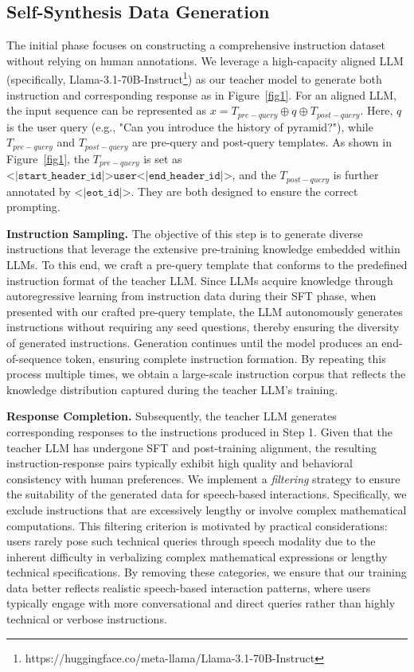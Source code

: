 \documentclass[letterpaper]{article} %
\begin{document}
\subsection{Self-Synthesis Data Generation}
The initial phase focuses on constructing a comprehensive instruction dataset without relying on human annotations. We leverage a high-capacity aligned LLM (specifically, Llama-3.1-70B-Instruct\footnote{https://huggingface.co/meta-llama/Llama-3.1-70B-Instruct}) as our teacher model to generate both instruction and corresponding response as in Figure~\ref{fig1}. For an aligned LLM, the input sequence can be represented as $x = T_{pre-query} \oplus q \oplus T_{post-query}$. Here, $q$ is the user query (e.g., "Can you introduce the history of pyramid?"), while $T_{pre-query}$ and $T_{post-query}$ are pre-query and post-query templates. As shown in Figure~\ref{fig1}, the $T_{pre-query}$ is set as $\texttt{<|start\_header\_id|>user<|end\_header\_id|>}$, and the $T_{post-query}$ is further annotated by $\texttt{<|eot\_id|>}$. They are both designed to ensure the correct prompting. \par
\noindent \textbf{Instruction Sampling.} The objective of this step is to generate diverse instructions that leverage the extensive pre-training knowledge embedded within LLMs. To this end, we craft a pre-query template that conforms to the predefined instruction format of the teacher LLM. Since LLMs acquire knowledge through autoregressive learning from instruction data during their SFT phase, when presented with our crafted pre-query template, the LLM autonomously generates instructions without requiring any seed questions, thereby ensuring the diversity of generated instructions. Generation continues until the model produces an end-of-sequence token, ensuring complete instruction formation. By repeating this process multiple times, we obtain a large-scale instruction corpus that reflects the knowledge distribution captured during the teacher LLM's training.\par
\noindent \textbf{Response Completion.} Subsequently, the teacher LLM generates corresponding responses to the instructions produced in Step 1. Given that the teacher LLM has undergone SFT and post-training alignment, the resulting instruction-response pairs typically exhibit high quality and behavioral consistency with human preferences. We implement a \textit{filtering} strategy to ensure the suitability of the generated data for speech-based interactions. Specifically, we exclude instructions that are excessively lengthy or involve complex mathematical computations. This filtering criterion is motivated by practical considerations: users rarely pose such technical queries through speech modality due to the inherent difficulty in verbalizing complex mathematical expressions or lengthy technical specifications. By removing these categories, we ensure that our training data better reflects realistic speech-based interaction patterns, where users typically engage with more conversational and direct queries rather than highly technical or verbose instructions. \par
\end{document}
